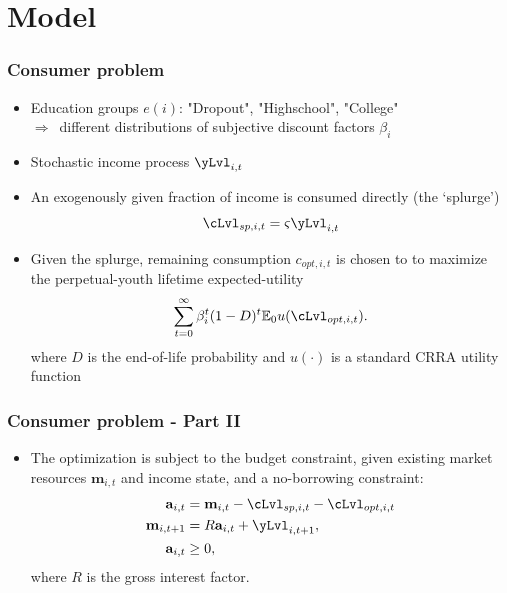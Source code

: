\documentclass[pdflatex,aspectratio=169]{beamer}
\newcommand{\ra}{\ensuremath{\Rightarrow}}
\begin{document}
\section{Model}

\begin{frame}
\frametitle{Consumer problem}
\begin{itemize}
	\itemsep = .5\bigskipamount 
	\item Education groups $e(i)$: "Dropout", "Highschool", "College" \\[1ex] 
	\ra\ different distributions of subjective discount factors $\beta_i$
	\item Stochastic income process $\yLvl_{i,t}$
	\item An exogenously given fraction of income is consumed directly (the `splurge')
		\begin{align}
		\cLvl_{sp,i,t} = \varsigma \yLvl_{i,t}
		\end{align}
	\item Given the splurge, remaining consumption $c_{opt,i,t}$ is chosen to to maximize the perpetual-youth lifetime expected-utility
		\begin{align}
		\sum_{t=0}^{\infty}\beta_i^t (1-D)^t \mathbb{E}_0 u(\cLvl_{opt,i,t}).
		\end{align}
		where $D$ is the end-of-life probability and $u(\cdot)$ is a standard CRRA utility function	
\end{itemize}
\end{frame}

\begin{frame}
\frametitle{Consumer problem - Part II}

	\begin{itemize}
		\item The optimization is subject to the budget constraint, given existing market resources $\mathbf{m}_{i,t}$ and income state, and a no-borrowing constraint: 
		\begin{align}
		\mathbf{a}_{i,t} &= \mathbf{m}_{i,t} - \cLvl_{sp,i,t} - \cLvl_{opt,i,t} \\
		\mathbf{m}_{i,t+1} &= R \mathbf{a}_{i,t} + \yLvl_{i,t+1}, \\
		\mathbf{a}_{i,t} &\geq 0,   \notag
		\end{align}
		where $R$ is the gross interest factor.
	\end{itemize}



\end{frame}
\end{document}
